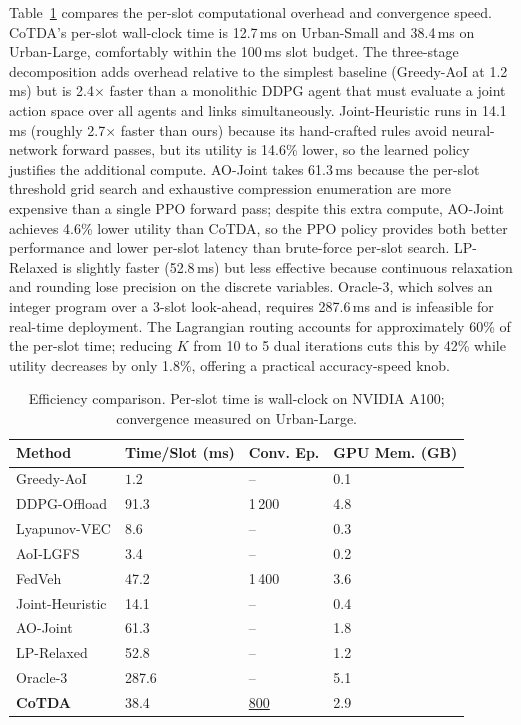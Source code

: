 \documentclass[final,3p,times,review,sort&compress]{elsarticle}
\begin{document}
Table~\ref{tab:efficiency} compares the per-slot computational overhead and convergence speed. CoTDA's per-slot wall-clock time is 12.7\,ms on Urban-Small and 38.4\,ms on Urban-Large, comfortably within the 100\,ms slot budget. The three-stage decomposition adds overhead relative to the simplest baseline (Greedy-AoI at 1.2\,ms) but is 2.4$\times$ faster than a monolithic DDPG agent that must evaluate a joint action space over all agents and links simultaneously. Joint-Heuristic runs in 14.1\,ms (roughly 2.7$\times$ faster than ours) because its hand-crafted rules avoid neural-network forward passes, but its utility is 14.6\% lower, so the learned policy justifies the additional compute. AO-Joint takes 61.3\,ms because the per-slot threshold grid search and exhaustive compression enumeration are more expensive than a single PPO forward pass; despite this extra compute, AO-Joint achieves 4.6\% lower utility than CoTDA, so the PPO policy provides both better performance and lower per-slot latency than brute-force per-slot search. LP-Relaxed is slightly faster (52.8\,ms) but less effective because continuous relaxation and rounding lose precision on the discrete variables. Oracle-3, which solves an integer program over a 3-slot look-ahead, requires 287.6\,ms and is infeasible for real-time deployment. The Lagrangian routing accounts for approximately 60\% of the per-slot time; reducing $K$ from 10 to 5 dual iterations cuts this by 42\% while utility decreases by only 1.8\%, offering a practical accuracy-speed knob.

\begin{table}[t!]
\centering
\caption{Efficiency comparison. Per-slot time is wall-clock on NVIDIA A100; convergence measured on Urban-Large.}
\label{tab:efficiency}
\begin{tabularx}{\columnwidth}{lXXX}
\toprule
\textbf{Method} & \textbf{Time/Slot} (ms) & \textbf{Conv. Ep.} & \textbf{GPU Mem.} (GB) \\
\midrule
Greedy-AoI & $\mathbf{1.2}$ & -- & 0.1 \\
DDPG-Offload & 91.3 & 1\,200 & 4.8 \\
Lyapunov-VEC & 8.6 & -- & 0.3 \\
AoI-LGFS & 3.4 & -- & 0.2 \\
FedVeh & 47.2 & 1\,400 & 3.6 \\
\midrule
Joint-Heuristic & 14.1 & -- & 0.4 \\
AO-Joint & 61.3 & -- & 1.8 \\
LP-Relaxed & 52.8 & -- & 1.2 \\
Oracle-3 & 287.6 & -- & 5.1 \\
\midrule
\textbf{CoTDA} & 38.4 & \underline{800} & 2.9 \\
\bottomrule
\end{tabularx}
\end{table}
\end{document}
